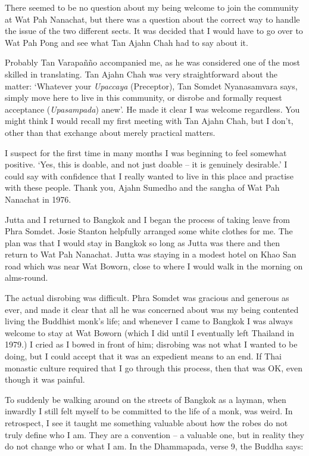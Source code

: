 There seemed to be no question about my being welcome to join the
community at Wat Pah Nanachat, but there was a question about the
correct way to handle the issue of the two different sects. It was
decided that I would have to go over to Wat Pah Pong and see what Tan
Ajahn Chah had to say about it.

Probably Tan Varapañño accompanied me, as he was considered one of the
most skilled in translating. Tan Ajahn Chah was very straightforward
about the matter: `Whatever your \emph{Upaccaya} (Preceptor), Tan Somdet
Nyanasamvara says, simply move here to live in this community, or
disrobe and formally request acceptance (\emph{Upasampada}) anew'. He
made it clear I was welcome regardless. You might think I would recall
my first meeting with Tan Ajahn Chah, but I don't, other than that
exchange about merely practical matters.

I suspect for the first time in many months I was beginning to feel
somewhat positive. `Yes, this is doable, and not just doable -- it is
genuinely desirable.' I could say with confidence that I really wanted
to live in this place and practise with these people. Thank you, Ajahn
Sumedho and the sangha of Wat Pah Nanachat in 1976.

Jutta and I returned to Bangkok and I began the process of taking leave
from Phra Somdet. Josie Stanton helpfully arranged some
white clothes for me. The plan was that I would stay in Bangkok so long
as Jutta was there and then return to Wat Pah Nanachat. Jutta was
staying in a modest hotel on Khao San road which was near Wat Boworn,
close to where I would walk in the morning on alms-round.

The actual disrobing was difficult. Phra Somdet was gracious and
generous as ever, and made it clear that all he was concerned about was
my being contented living the Buddhist monk's life; and whenever I came
to Bangkok I was always welcome to stay at Wat Boworn (which I did until
I eventually left Thailand in 1979.) I cried as I bowed in front of him; disrobing
was not what I wanted to be doing, but I could accept that it was an
expedient means to an end. If Thai monastic culture required that I go
through this process, then that was OK, even though it was painful.

To suddenly be walking around on the streets of Bangkok as a layman,
when inwardly I still felt myself to be committed to the life of a monk,
was weird. In retrospect, I see it taught me something valuable about
how the robes do not truly define who I am. They are a convention -- a
valuable one, but in reality they do not change who or what I am. In the
Dhammapada, verse 9, the Buddha says:


